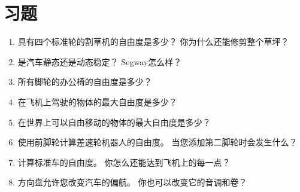 \section*{习题}\small
\begin{enumerate}
\item 具有四个标准轮的割草机的自由度是多少？ 你为什么还能修剪整个草坪？
\item 是汽车静态还是动态稳定？ Segway怎么样？
\item 所有脚轮的办公椅的自由度是多少？
\item 在飞机上驾驶的物体的最大自由度是多少？
\item 在世界上可以自由移动的物体的最大自由度是多少？
\item 使用前脚轮计算差速轮机器人的自由度。 当您添加第二脚轮时会发生什么？
\item 计算标准车的自由度。 你怎么还能达到飞机上的每一点？
\item 方向盘允许您改变汽车的偏航。 你也可以改变它的音调和卷？
\end{enumerate}\normalsize